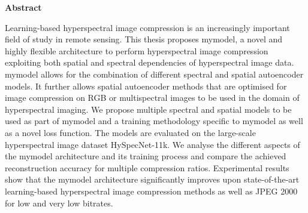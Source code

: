 \thispagestyle{empty}
\vspace*{1.4cm}

\begin{center}
    {\Large \textbf{Abstract}}
\end{center}

\vspace*{0.5cm}

\noindent
Learning-based hyperspectral image compression is an increasingly important field of study in remote sensing. This thesis proposes \ac{mymodel}, a novel and highly flexible architecture to perform hyperspectral image compression exploiting both spatial and spectral dependencies of hyperspectral image data. \ac{mymodel} allows for the combination of different spectral and spatial autoencoder models. It further allows spatial autoencoder methods that are optimised for image compression on RGB or multispectral images to be used in the domain of hyperspectral imaging. We propose multiple spectral and spatial models to be used as part of \ac{mymodel} and a training methodology specific to \ac{mymodel} as well as a novel loss function. The models are evaluated on the large-scale hyperspectral image dataset HySpecNet-11k. We analyse the different aspects of the \ac{mymodel} architecture and its training process and compare the achieved reconstruction accuracy for multiple compression ratios. Experimental results show that the \ac{mymodel} architecture significantly improves upon state-of-the-art learning-based hyperspectral image compression methods as well as JPEG 2000 for low and very low bitrates.
\\